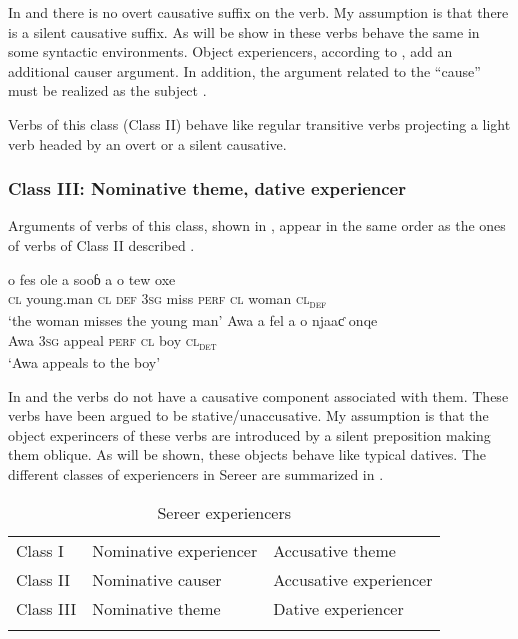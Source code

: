 \documentclass[output=paper]{langscibook}
\begin{document}
In  and  there is no overt causative suffix on the verb. My assumption is  that there is a silent causative suffix. As will be show in  these verbs behave the same in some syntactic environments. Object experiencers, according to \citet{Pesetsky1995}, add an additional causer argument. In addition, the argument related to the “cause” must be realized as the subject \citep{Grimshaw1990}.

Verbs of this class (Class II) behave like regular transitive verbs projecting a light verb headed by an overt or a silent causative.

\subsubsection{Class III: Nominative theme, dative experiencer}

Arguments of verbs of this class, shown in , appear in the same order as the ones of verbs of Class II described .

\ea \label{ex:tamba:7}
\ea \label{ex:tamba:7a}
\gll o  fes              ole         a          sooɓ  a        o  tew        oxe\\
    \textsc{cl} young.man  \textsc{cl\textsubscript{} \textsc{def}}    \textsc{3sg}       miss  \textsc{perf}   \textsc{cl}  woman \textsc{cl\textsubscript{def}}\\
\glt `the woman  misses the young man'
\ex \label{ex:tamba:7b}
\gll Awa a     fel         a       o     njaaƈ onqe\\
Awa \textsc{3sg} appeal \textsc{perf}  \textsc{cl}   boy   \textsc{cl\textsubscript{det} }\\
\glt `Awa appeals to the boy'
\z
\z

In  and  the verbs do not have a causative component associated with them. These verbs have been argued to be stative/unaccusative. My assumption is that the object experincers of these verbs are introduced by a silent preposition making them oblique. As will be shown, these objects behave like typical datives. The different classes of experiencers in Sereer are summarized in .
 
\begin{table}
\caption{Sereer experiencers}
\label{tab:tamba:2}
\begin{tabular}{lll}
\lsptoprule
{Class I} & Nominative experiencer & Accusative theme\\
{Class II} & Nominative causer & Accusative experiencer\\
{Class III} & Nominative theme & Dative experiencer\\
\lspbottomrule
\end{tabular}
\end{table}
\end{document}
